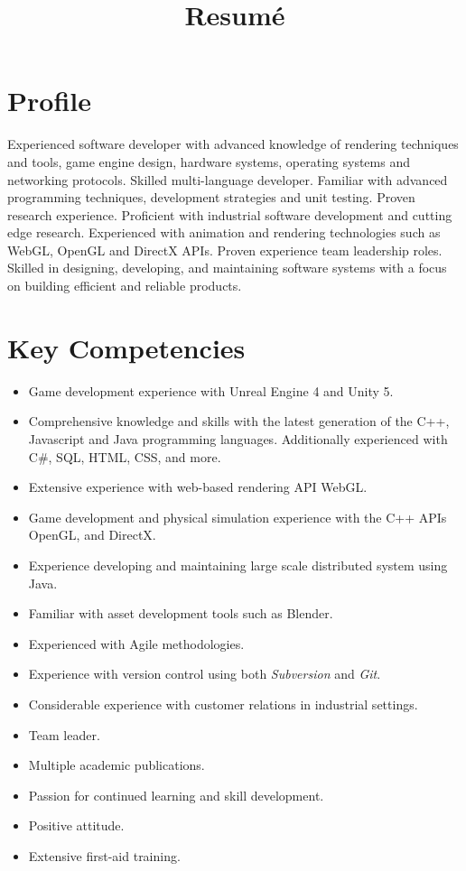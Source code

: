 \documentclass[11pt,a4paper,sans]{moderncv}        %
\title{Resumé}                               %
\begin{document}
\makecvtitle
\section{Profile}
Experienced software developer with advanced knowledge of rendering techniques and tools, game engine design, hardware systems, operating systems and networking protocols. 
Skilled multi-language developer. 
Familiar with advanced programming techniques, development strategies and unit testing.
Proven research experience. 
Proficient with industrial software development and cutting edge research.
Experienced with animation and rendering technologies such as WebGL, OpenGL and DirectX APIs. 
Proven experience team leadership roles.
Skilled in designing, developing, and maintaining software systems with a focus on building efficient and reliable products.
\section{Key Competencies}
\begin{itemize}
	\item Game development experience with Unreal Engine 4 and Unity 5.
	\item Comprehensive knowledge and skills with the latest generation of the C++, Javascript and Java programming languages. Additionally experienced with C\#, SQL, HTML, CSS, and more.
	\item Extensive experience with web-based rendering API WebGL.
	\item Game development and physical simulation experience with the C++ APIs OpenGL, and DirectX.
	\item Experience developing and maintaining large scale distributed system using Java.
	\item Familiar with asset development tools such as Blender.
	\item Experienced with Agile methodologies.
	\item Experience with version control using both \textit{Subversion} and \textit{Git}.
	\item Considerable experience with customer relations in industrial settings.
	\item Team leader.
	\item Multiple academic publications.
	\item Passion for continued learning and skill development.
	\item Positive attitude.
	\item Extensive first-aid training.
\end{itemize}
\end{document}
